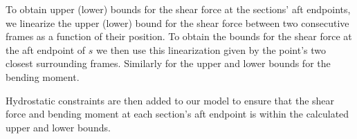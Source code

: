 To obtain upper (lower) bounds for the shear force at the sections' aft endpoints,  
we linearize the upper (lower) bound for the shear force between two consecutive frames as a function of their position. To obtain the bounds for the shear force at the aft endpoint of $s$ we then use this linearization given by the point's two closest surrounding frames. Similarly for the upper and lower bounds for the bending moment.

Hydrostatic constraints are then added to our model to ensure that the shear force and bending moment at each section's aft endpoint is within the calculated upper and lower bounds.


